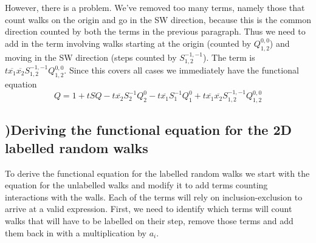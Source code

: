 \documentclass[12pt]{article}
\theoremstyle{definition} \newtheorem{definition}[theorem]{Definition}
\newcommand{\ol}[1]{\overline{#1}}
\newcommand{\Q}[2]{Q_{#1}^{#2}}
\newcommand{\Qf}[1]{Q_{1,2}^{#1}}
\newcommand{\es}[2]{S_{#1}^{#2}}
\newcommand{\Sf}[1]{S_{1,2}^{#1}}
\begin{document}
However, there is a problem. We've removed too many terms, namely those that count walks on the origin and go in the SW direction, because this is the common direction counted by both the terms in the previous paragraph. Thus we need to add in the term involving walks starting at the origin (counted by $\Qf{0,0}$) and moving in the SW direction (steps counted by $\Sf{-1,-1}$). The term is $t\ol{x_1}\ol{x_2}\Sf{-1,-1}\Qf{0,0}$. Since this covers all cases we immediately have the functional equation
\[
Q = 1 + tSQ - t \ol{x_2}\es{2}{-1}\Q{2}{0} - t\ol{x_1}\es{1}{-1}\Q{1}{0}+t\ol{x_1}\ol{x_2}\Sf{-1,-1}\Qf{0,0}
\]

\subsection{)Deriving the functional equation for the 2D labelled random walks}

To derive the functional equation for the labelled random walks we start with the equation for the unlabelled walks and modify it to add terms counting interactions with the walls. Each of the terms will rely on inclusion-exclusion to arrive at a valid expression. First, we need to identify which terms will count walks that will have to be labelled on their step, remove those terms and add them back in with a multiplication by $a_i$.
\end{document}
